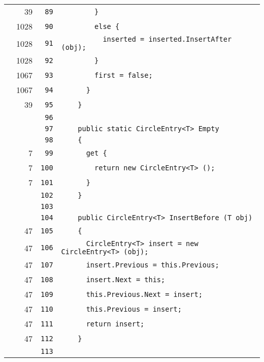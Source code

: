 \documentclass[a4paper,10pt]{article}
\begin{document}
\begin{longtable}[l]{lrrl}
\cellcolor{green} & 39 & \verb~89~ & \verb~        }~\\
\cellcolor{green} & 1028 & \verb~90~ & \verb~        else {~\\
\cellcolor{green} & 1028 & \verb~91~ & \verb~          inserted = inserted.InsertAfter (obj);~\\
\cellcolor{green} & 1028 & \verb~92~ & \verb~        }~\\
\cellcolor{green} & 1067 & \verb~93~ & \verb~        first = false;~\\
\cellcolor{green} & 1067 & \verb~94~ & \verb~      }~\\
\cellcolor{green} & 39 & \verb~95~ & \verb~    }~\\
\cellcolor{gray} &  & \verb~96~ & \verb~~\\
\cellcolor{gray} &  & \verb~97~ & \verb~    public static CircleEntry<T> Empty~\\
\cellcolor{gray} &  & \verb~98~ & \verb~    {~\\
\cellcolor{green} & 7 & \verb~99~ & \verb~      get {~\\
\cellcolor{green} & 7 & \verb~100~ & \verb~        return new CircleEntry<T> ();~\\
\cellcolor{green} & 7 & \verb~101~ & \verb~      }~\\
\cellcolor{gray} &  & \verb~102~ & \verb~    }~\\
\cellcolor{gray} &  & \verb~103~ & \verb~~\\
\cellcolor{gray} &  & \verb~104~ & \verb~    public CircleEntry<T> InsertBefore (T obj)~\\
\cellcolor{green} & 47 & \verb~105~ & \verb~    {~\\
\cellcolor{green} & 47 & \verb~106~ & \verb~      CircleEntry<T> insert = new CircleEntry<T> (obj);~\\
\cellcolor{green} & 47 & \verb~107~ & \verb~      insert.Previous = this.Previous;~\\
\cellcolor{green} & 47 & \verb~108~ & \verb~      insert.Next = this;~\\
\cellcolor{green} & 47 & \verb~109~ & \verb~      this.Previous.Next = insert;~\\
\cellcolor{green} & 47 & \verb~110~ & \verb~      this.Previous = insert;~\\
\cellcolor{green} & 47 & \verb~111~ & \verb~      return insert;~\\
\cellcolor{green} & 47 & \verb~112~ & \verb~    }~\\
\cellcolor{gray} &  & \verb~113~ & \verb~~\\

\end{longtable}
\end{document}
